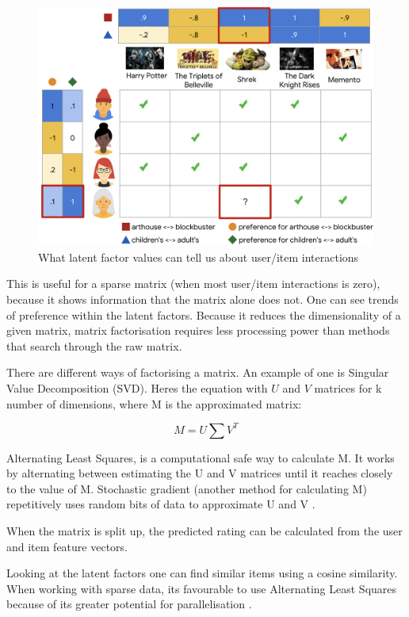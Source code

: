 \begin{figure}[H]
	\includegraphics[scale=0.45]{images/latent_factors}
	\centering
	\caption{What latent factor values can tell us about user/item interactions \citep{httpsdevelopersgooglecom_matrix_2023}} 
	\label{fig:figure}
\end{figure}

This is useful for a sparse matrix (when most user/item interactions is zero), because it shows information that the matrix alone does not.  One can see trends of preference within the latent factors. Because it reduces the dimensionality of a given matrix, matrix factorisation requires less processing power than methods that search through the raw matrix. 

There are different ways of factorising a matrix. An example of one is Singular Value Decomposition (SVD). Heres the equation with $U$ and $V$ matrices for k number of dimensions,  where M is the approximated matrix:

\begin{equation}
	M = U \sum V ^{T}
\end{equation}

Alternating Least Squares, is a computational safe way to calculate M. It works by alternating between estimating the U and V matrices until it reaches closely to the value of M. Stochastic gradient (another method for calculating M) repetitively uses random bits of data to approximate U and V \citep{koren_matrix_2009}. 

When the matrix is split up, the predicted rating can be calculated from the user and item feature vectors. 


Looking at the latent factors one can find  similar items using a cosine similarity. When working with sparse data, its favourable to use Alternating Least Squares because of its greater potential for parallelisation \citep{koren_matrix_2009}.

